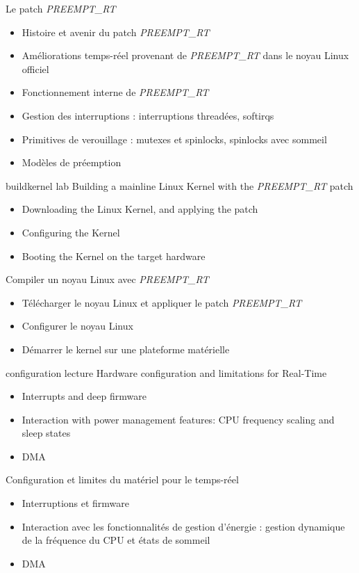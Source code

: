 {Le patch {\em PREEMPT\_RT}}
{
  \begin{itemize}
  \item Histoire et avenir du patch {\em PREEMPT\_RT}
  \item Améliorations temps-réel provenant de {\em PREEMPT\_RT} dans le noyau Linux officiel
  \item Fonctionnement interne de {\em PREEMPT\_RT}
  \item Gestion des interruptions : interruptions threadées, softirqs
  \item Primitives de verouillage : mutexes et spinlocks, spinlocks avec sommeil
  \item Modèles de préemption
  \end{itemize}
}
{buildkernel}
{lab}
{Building a mainline Linux Kernel with the {\em PREEMPT\_RT} patch}
{
  \begin{itemize}
  \item Downloading the Linux Kernel, and applying the patch
  \item Configuring the Kernel
  \item Booting the Kernel on the target hardware
 \end{itemize}
}
{Compiler un noyau Linux avec {\em PREEMPT\_RT}}
{
  \begin{itemize}
  \item Télécharger le noyau Linux et appliquer le patch {\em PREEMPT\_RT}
  \item Configurer le noyau Linux
  \item Démarrer le kernel sur une plateforme matérielle
 \end{itemize}
}
{configuration}
{lecture}
{Hardware configuration and limitations for Real-Time}
{
  \begin{itemize}
  \item Interrupts and deep firmware
  \item Interaction with power management features: CPU frequency
    scaling and sleep states
  \item DMA
  \end{itemize}
}
{Configuration et limites du matériel pour le temps-réel}
{
  \begin{itemize}
  \item Interruptions et firmware
  \item Interaction avec les fonctionnalités de gestion d'énergie :
    gestion dynamique de la fréquence du CPU et états de sommeil
  \item DMA
  \end{itemize}
}
